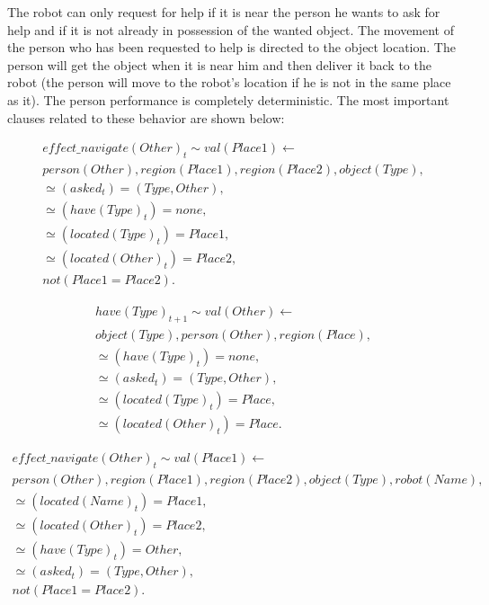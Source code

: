 The robot can only request for help if it is near the person he wants to ask for help and if it
is not already in possession of the wanted object.
The movement of the person who has been requested to help is directed to the object location. The 
person will get the object when it is near him and then deliver it back to the robot (the person 
will move to the robot's location if he is not in the same place as it). The person performance is 
completely deterministic.
The most important clauses related to these behavior are shown below:

\begin{align*} 
    effect\_navigate(Other)_t \sim val(Place1) \leftarrow \\
    person(Other), region(Place1), region(Place2), object(Type), \\
    \simeq(asked_t) = (Type, Other), \\
    \simeq(have(Type)_t) = none, \\
    \simeq(located(Type)_t) = Place1, \\
    \simeq(located(Other)_t) = Place2, \\
    not(Place1 = Place2).
\end{align*}

\begin{align*} 
    have(Type)_{t+1} \sim val(Other) \leftarrow \\
    object(Type), person(Other), region(Place), \\
    \simeq(have(Type)_t) = none, \\
    \simeq(asked_t) = (Type, Other), \\
    \simeq(located(Type)_t) = Place, \\
    \simeq(located(Other)_t) = Place.
\end{align*}

\begin{align*} 
    effect\_navigate(Other)_t \sim val(Place1) \leftarrow \\
    person(Other), region(Place1), region(Place2), object(Type), robot(Name), \\
    \simeq(located(Name)_t) = Place1, \\
    \simeq(located(Other)_t) = Place2, \\
    \simeq(have(Type)_t) = Other, \\
    \simeq(asked_t) = (Type, Other), \\
    not(Place1 = Place2).
\end{align*}

